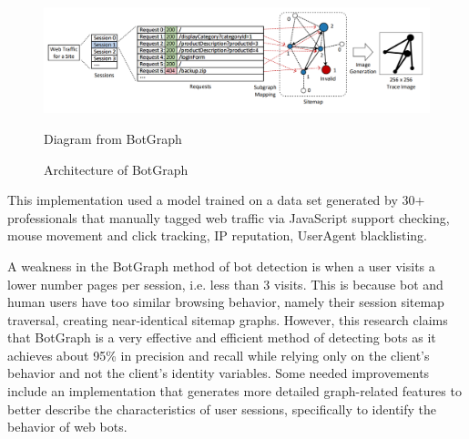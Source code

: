 \begin{figure}[!h]
    \includegraphics[width=1\columnwidth]{figures/BotGraph_fig1}
    \caption{Architecture of BotGraph}
    {\small Diagram from BotGraph~\cite{botgraph}}
    \label{fig:botgraph}
\end{figure}
This implementation used a model trained on a data set generated by 30+ professionals that manually tagged web traffic via JavaScript support checking, mouse movement and click tracking, IP reputation, UserAgent blacklisting.

A weakness in the BotGraph method of bot detection is when a user visits a lower number pages per session, i.e. less than 3 visits.
This is because bot and human users have too similar browsing behavior, namely their session sitemap traversal, creating near-identical sitemap graphs.
However, this research claims that BotGraph is a very effective and efficient method of detecting bots as it achieves about 95\% in precision and recall while relying only on the client's behavior and not the client's identity variables.
Some needed improvements include an implementation that generates more detailed graph-related features to better describe the characteristics of user sessions, specifically to identify the behavior of web bots.

